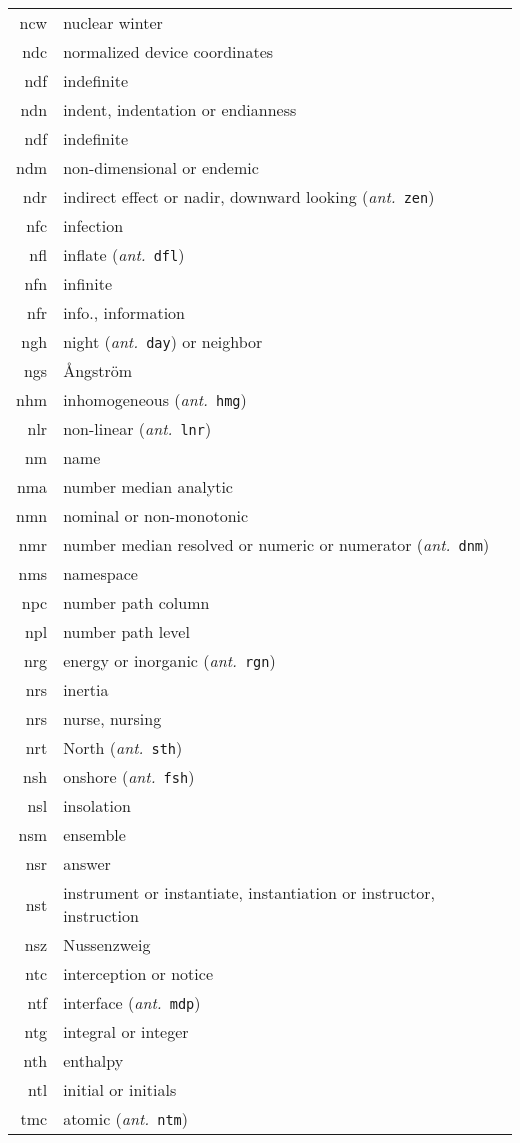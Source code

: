\documentclass[12pt,twoside]{article}
\newcommand{\ant}[1]{(\textit{ant.}~\texttt{#1})}
\begin{document}
\begin{longtable}[>{\bfseries}l]{>{\ttfamily}r l}
ncw & nuclear winter \\
ndc & normalized device coordinates \\
ndf & indefinite \\
ndn & indent, indentation or endianness \\
ndf & indefinite \\
ndm & non-dimensional or endemic \\
ndr & indirect effect or nadir, downward looking \ant{zen} \\
nfc & infection \\
nfl & inflate \ant{dfl} \\
nfn & infinite \\
nfr & info., information \\
ngh & night \ant{day} or neighbor \\
ngs & {\AA}ngstr\"{o}m \\
nhm & inhomogeneous \ant{hmg} \\
nlr & non-linear \ant{lnr} \\
nm & name \\
nma & number median analytic \\
nmn & nominal or non-monotonic \\
nmr & number median resolved or numeric or numerator \ant{dnm} \\
nms & namespace \\
npc & number path column \\
npl & number path level \\
nrg & energy or inorganic \ant{rgn} \\
nrs & inertia \\
nrs & nurse, nursing \\
nrt & North \ant{sth} \\
nsh & onshore \ant{fsh} \\
nsl & insolation \\
nsm & ensemble \\
nsr & answer \\
nst & instrument or instantiate, instantiation or instructor, instruction \\
nsz & Nussenzweig \\
ntc & interception or notice \\
ntf & interface \ant{mdp} \\
ntg & integral or integer \\
nth & enthalpy \\
ntl & initial or initials \\
tmc & atomic \ant{ntm} \\

\end{longtable}
\end{document}
